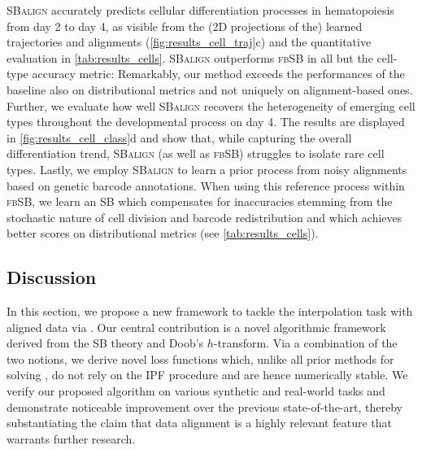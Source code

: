 \textsc{SBalign} accurately predicts cellular differentiation processes in hematopoiesis from day 2 to day 4, as visible from the (2D projections of the) learned trajectories and alignments (\cref{fig:results_cell_traj}c) and the quantitative evaluation in \cref{tab:results_cells}. \textsc{SBalign} outperforms \textsc{fbSB} in all but the cell-type accuracy metric: Remarkably, our method exceeds the performances of the baseline also on distributional metrics and not uniquely on alignment-based ones. Further, we evaluate how well \textsc{SBalign} recovers the heterogeneity of emerging cell types throughout the developmental process on day 4. The results are displayed in \cref{fig:results_cell_class}d and show that, while capturing the overall differentiation trend, \textsc{SBalign} (as well as \textsc{fbSB}) struggles to isolate rare cell types.
Lastly, we employ \textsc{SBalign} to learn a prior process from noisy alignments based on genetic barcode annotations. When using this reference process within \textsc{fbSB}, we learn an \acrshort{SB} which compensates for inaccuracies stemming from the stochastic nature of cell division and barcode redistribution and which achieves better scores on distributional metrics (see \cref{tab:results_cells}).

\subsection{Discussion}

In this section, we propose a new framework to tackle the interpolation task with aligned data via . Our central contribution is a novel algorithmic framework derived from the \acrlong{SB} theory and Doob's $h$-transform. Via a combination of the two notions, we derive novel loss functions which, unlike all prior methods for solving , do not rely on the \acrlong{IPF} procedure and are hence numerically stable. We verify our proposed algorithm on various synthetic and real-world tasks and demonstrate noticeable improvement over the previous state-of-the-art, thereby substantiating the claim that data alignment is a highly relevant feature that warrants further research.
